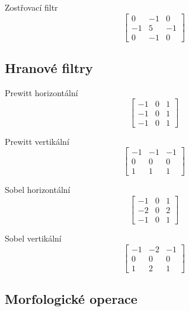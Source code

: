 \documentclass[FM,DP]{tulthesis}
\begin{document}
Zostřovací filtr
\begin{equation}
    \begin{bmatrix}
        0  & -1 & 0  \\
        -1 & 5  & -1 \\
        0  & -1 & 0
    \end{bmatrix}
\end{equation}

\subsection{Hranové filtry}

Prewitt horizontální
\begin{equation}
    \begin{bmatrix}
        -1 & 0 & 1 \\
        -1 & 0 & 1 \\
        -1 & 0 & 1
    \end{bmatrix}
\end{equation}

Prewitt vertikální
\begin{equation}
    \begin{bmatrix}
        -1 & -1 & -1 \\
        0  & 0  & 0  \\
        1  & 1  & 1
    \end{bmatrix}
\end{equation}

Sobel horizontální
\begin{equation}
    \begin{bmatrix}
        -1 & 0 & 1 \\
        -2 & 0 & 2 \\
        -1 & 0 & 1
    \end{bmatrix}
\end{equation}

Sobel vertikální
\begin{equation}
    \begin{bmatrix}
        -1 & -2 & -1 \\
        0  & 0  & 0  \\
        1  & 2  & 1
    \end{bmatrix}
\end{equation}

\subsection{Morfologické operace}
\end{document}
